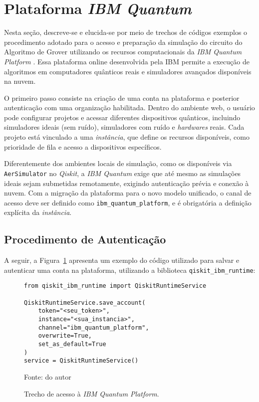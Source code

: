 \section{Plataforma \textit{IBM Quantum}}
\label{sec: plataformaIBM}

Nesta seção, descreve-se e elucida-se por meio de trechos de códigos exemplos o procedimento adotado para o acesso e preparação da simulação do circuito do Algoritmo de Grover utilizando os recursos computacionais da \textit{IBM Quantum Platform} \cite{IBM_quantum}. Essa plataforma online desenvolvida pela IBM permite a execução de algoritmos em computadores quânticos reais e simuladores avançados disponíveis na nuvem.

O primeiro passo consiste na criação de uma conta na plataforma e posterior autenticação com uma organização habilitada. Dentro do ambiente web, o usuário pode configurar projetos e acessar diferentes dispositivos quânticos, incluindo simuladores ideais (sem ruído), simuladores com ruído e \textit{hardwares} reais. Cada projeto está vinculado a uma \textit{instância}, que define os recursos disponíveis, como prioridade de fila e acesso a dispositivos específicos.

Diferentemente dos ambientes locais de simulação, como os disponíveis via \texttt{AerSimulator} no \textit{Qiskit}, a \textit{IBM Quantum} exige que até mesmo as simulações ideais sejam submetidas remotamente, exigindo autenticação prévia e conexão à nuvem. Com a migração da plataforma para o novo modelo unificado, o canal de acesso deve ser definido como \verb|ibm_quantum_platform|, e é obrigatória a definição explícita da \textit{instância}.

\subsection{Procedimento de Autenticação}
\label{subSec: auth}

A seguir, a Figura~\ref{cod: acessaIBM} apresenta um exemplo do código utilizado para salvar e autenticar uma conta na plataforma, utilizando a biblioteca \verb|qiskit_ibm_runtime|:

\begin{figure}[!htb]
\centering
\caption{Trecho de acesso à \textit{IBM Quantum Platform}.} 
\begin{verbatim}
from qiskit_ibm_runtime import QiskitRuntimeService

QiskitRuntimeService.save_account(
    token="<seu_token>",
    instance="<sua_instancia>",
    channel="ibm_quantum_platform",
    overwrite=True,
    set_as_default=True
)
service = QiskitRuntimeService()
\end{verbatim} 
{\small Fonte: do autor} 
\label{cod: acessaIBM} 
\end{figure}

